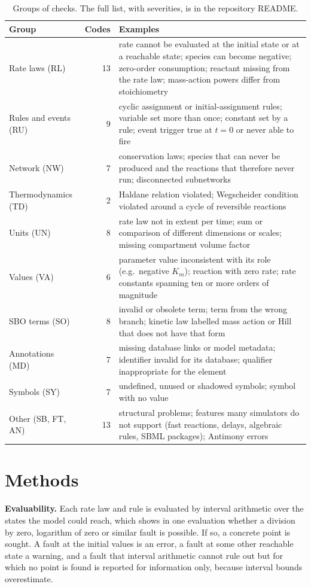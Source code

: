 \documentclass[10pt]{article}
\begin{document}
\begin{table}[ht]
\centering\footnotesize
\begin{tabularx}{\textwidth}{@{}lrX@{}}
\toprule
Group & Codes & Examples \\
\midrule
Rate laws (RL) & 13 & rate cannot be evaluated at the initial state or at a reachable state; species can become negative; zero-order consumption; reactant missing from the rate law; mass-action powers differ from stoichiometry \\
Rules and events (RU) & 9 & cyclic assignment or initial-assignment rules; variable set more than once; constant set by a rule; event trigger true at $t=0$ or never able to fire \\
Network (NW) & 7 & conservation laws; species that can never be produced and the reactions that therefore never run; disconnected subnetworks \\
Thermodynamics (TD) & 2 & Haldane relation violated; Wegscheider condition violated around a cycle of reversible reactions \\
Units (UN) & 8 & rate law not in extent per time; sum or comparison of different dimensions or scales; missing compartment volume factor \\
Values (VA) & 6 & parameter value inconsistent with its role (e.g.\ negative $K_m$); reaction with zero rate; rate constants spanning ten or more orders of magnitude \\
SBO terms (SO) & 8 & invalid or obsolete term; term from the wrong branch; kinetic law labelled mass action or Hill that does not have that form \\
Annotations (MD) & 7 & missing database links or model metadata; identifier invalid for its database; qualifier inappropriate for the element \\
Symbols (SY) & 7 & undefined, unused or shadowed symbols; symbol with no value \\
Other (SB, FT, AN) & 13 & structural problems; features many simulators do not support (fast reactions, delays, algebraic rules, SBML packages); Antimony errors \\
\bottomrule
\end{tabularx}
\vspace{-0.8em}
\caption{Groups of checks. The full list, with severities, is in the repository README.}
\label{tab:checks}
\end{table}
\vspace{-1.2em}

\section{Methods}
\textbf{Evaluability.} Each rate law and rule is evaluated by interval arithmetic \cite{moore2009interval}
over the states the model could reach, which shows in one evaluation whether a division by zero, logarithm of
zero or similar fault is possible. If so, a concrete point is sought. A fault at the initial values is an error, a fault at some other reachable state a warning, and a
fault that interval arithmetic cannot rule out but for which no point is found is reported for information
only, because interval bounds overestimate.
\end{document}
